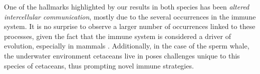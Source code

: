 One of the hallmarks highlighted by our results in both species has been \textit{altered intercellular communication}, mostly due to the several occurrences in the immune system.
It is no surprise to observe a larger number of occurrences linked to these processes, given the fact that the immune system is considered a driver of evolution, especially in mammals \cite{Keane2015,Puente2006,Worley2014a}.
Additionally, in the case of the sperm whale, the underwater environment cetaceans live in poses challenges unique to this species of cetaceans, thus prompting novel immune strategies.


